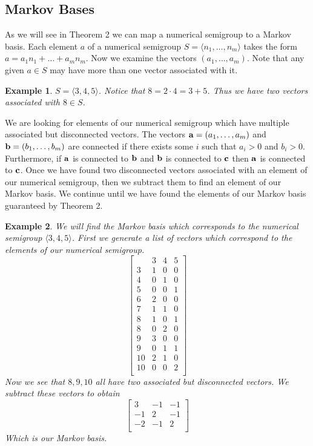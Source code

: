 \documentclass[11pt]{amsart}
\theoremstyle{plain}
\newtheorem{exa}{Example}
\theoremstyle{definition}
\begin{document}
\subsection{Markov Bases}
As we will see in Theorem 2 we can map a numerical semigroup to a Markov
basis\cite{bernd}.
Each element $a$ of a numerical semigroup $S=\langle n_1,\dots,n_m\rangle$ takes
the form $a=a_1n_1+\dots+a_mn_m$. Now we examine the vectors $(a_1,\dots,a_m)$.
Note that any given $a\in S$ may have more than one vector associated with it.
\begin{exa}
  $S=\langle 3,4,5\rangle$. Notice that $8=2\cdot 4=3+5$. Thus we have two
  vectors associated with $8\in S$.
\end{exa}
We are looking for elements of our numerical semigroup which have multiple
associated but disconnected vectors. The vectors ${\bf a}=(a_1,\dots,a_m)$
and ${\bf b}=(b_1,\dots,b_m)$ are connected if there exists some $i$
such that $a_i>0$ and $b_i>0$. Furthermore, if ${\bf a}$ is connected to
${\bf b}$ and ${\bf b}$ is connected to ${\bf c}$ then ${\bf a}$ is connected to
${\bf c}$. Once we have found two disconnected vectors associated with an
element of our numerical semigroup, then we subtract them to find an element
of our Markov basis. We continue until we have found the elements of our Markov
basis guaranteed by Theorem 2.

\begin{exa}
  We will find the Markov basis which corresponds to the numerical semigroup
$\langle 3,4,5\rangle$. First we generate a list of vectors which correspond
to the elements of our numerical semigroup.
\[\left[\begin{array}{r|rrr}
&3&4&5\\
\hline
3&1&0&0\\
4&0&1&0\\
5&0&0&1\\
6&2&0&0\\
7&1&1&0\\
8&1&0&1\\
8&0&2&0\\
9&3&0&0\\
9&0&1&1\\
10&2&1&0\\
10&0&0&2\\
\end{array}\right]
\]
Now we see that $8,9,10$ all have two associated but disconnected vectors. We
subtract these vectors to obtain
\[
  \left[\begin{array}{rrr}
  3&-1&-1\\
  -1&2&-1\\
  -2&-1&2\\
  \end{array}\right]
\]
Which is our Markov basis.
\end{exa}
\end{document}

